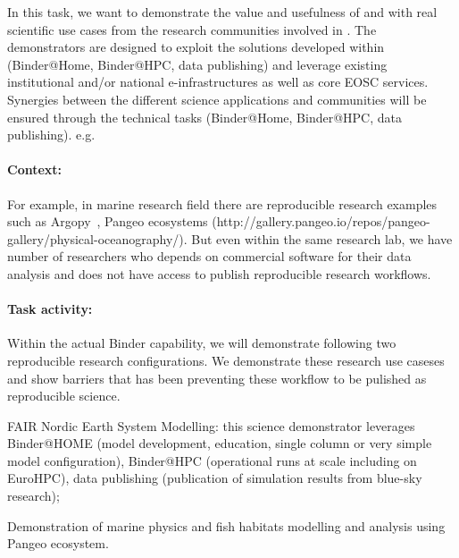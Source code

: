 \begin{task}[
  title=Science demonstrators,
  id=demos,
  lead=MP,
  PM=8,
  partners={IFR,UIO}
]

  In this task, we want to demonstrate the value and usefulness of  and
   with real scientific use cases from the research communities involved in \TheProject.
  The demonstrators are designed to exploit the solutions developed within \TheProject (Binder@Home, Binder@HPC, data publishing) 
  and leverage existing institutional and/or national e-infrastructures as well as core EOSC services.
  Synergies between the different science applications and communities will be ensured through the technical tasks (Binder@Home, Binder@HPC, data publishing).
  e.g. 

\paragraph*{Context:}  For example, in marine research field there are reproducible research examples such as Argopy~\cite{maze2020},  Pangeo ecosystems (http://gallery.pangeo.io/repos/pangeo-gallery/physical-oceanography/). But even within the same research lab, we have number of researchers who depends on commercial software for their data analysis and does not have access to publish reproducible research workflows.   


\paragraph*{Task activity:}
 
Within the actual Binder capability, we will demonstrate following two reproducible research configurations.  We demonstrate these research use caseses and show barriers that has been preventing these workflow to be pulished as reproducible science.   



  \begin{compactitem}
  \item FAIR Nordic Earth System Modelling: this science demonstrator leverages Binder@HOME (model development, education, single column or very simple model configuration), Binder@HPC (operational runs at scale including on EuroHPC), data publishing (publication of simulation results from blue-sky research);
  \item Demonstration of marine physics and fish habitats modelling and analysis using Pangeo ecosystem.  
  

\end{compactitem}
\end{task}

